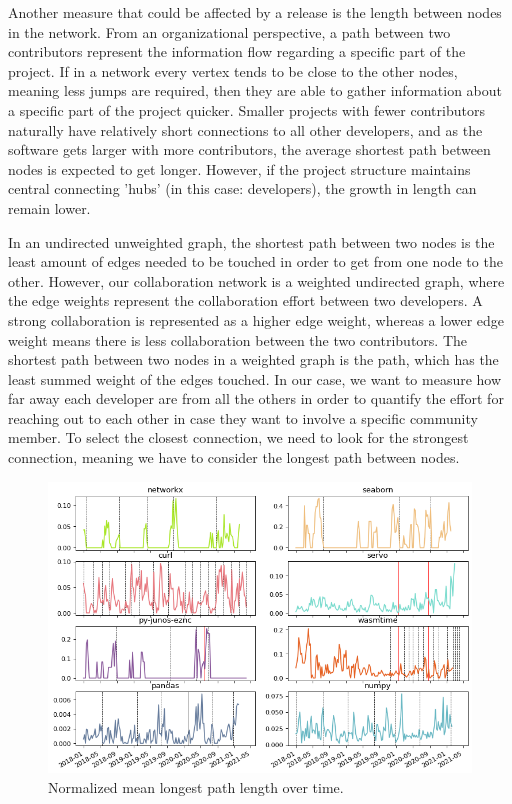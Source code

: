 Another measure that could be affected by a release is the length between nodes in the network. From an organizational perspective, a path between two contributors represent the information flow regarding a specific part of the project. If in a network every vertex tends to be close to the other nodes, meaning less jumps are required, then they are able to gather information about a specific part of the project quicker. Smaller projects with fewer contributors naturally have relatively short connections to all other developers, and as the software gets larger with more contributors, the average shortest path between nodes is expected to get longer. However, if the project structure maintains central connecting 'hubs' (in this case: developers), the growth in length can remain lower.

In an undirected unweighted graph, the shortest path between two nodes is the least amount of edges needed to be touched in order to get from one node to the other. However, our collaboration network is a weighted undirected graph, where the edge weights represent the collaboration effort between two developers. A strong collaboration is represented as a higher edge weight, whereas a lower edge weight means there is less collaboration between the two contributors. The shortest path between two nodes in a weighted graph is the path, which has the least summed weight of the edges touched. In our case, we want to measure how far away each developer are from all the others in order to quantify the effort for reaching out to each other in case they want to involve a specific community member. To select the closest connection, we need to look for the strongest connection, meaning we have to consider the longest path between nodes.

\begin{figure}
    \centering
    \includegraphics[width=\textwidth]{figures/qualitative/mean_path_length/path_length_all_normalized.png}
    \caption{Normalized mean longest path length over time.}
    \label{fig:mean_path}
\end{figure}

